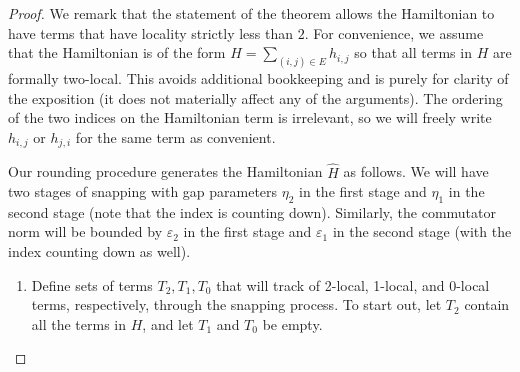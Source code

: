 \documentclass[a4paper,onecolumn,11pt]{quantumarticle}
\theoremstyle{plain}
\newcommand{\eps}{\varepsilon}
\begin{document}
\begin{proof}
We remark that the statement of the theorem allows the Hamiltonian to have terms that have locality strictly less than $2$. For convenience, we assume that the Hamiltonian is of the form $H = \sum_{(i,j) \in E} h_{i,j}$ so that all terms in $H$ are formally two-local. This avoids additional bookkeeping and is purely for clarity of the exposition (it does not materially affect any of the arguments). The ordering of the two indices on the Hamiltonian term is irrelevant, so we will freely write $h_{i,j}$ or $h_{j,i}$ for the same term as convenient.

Our rounding procedure generates the Hamiltonian $\hat{H}$ as follows. We will have two stages of snapping with gap parameters $\eta_2$ in the first stage and $\eta_1$ in the second stage (note that the index is counting down). Similarly, the commutator norm will be bounded by $\eps_2$ in the first stage and $\eps_1$ in the second stage (with the index counting down as well).

\begin{enumerate}

    \item Define sets of terms $T_2, T_1, T_0$ that will track of 2-local, 1-local, and 0-local terms, respectively, through the snapping process. To start out, let $T_2$ contain all the terms in $H$, and let $T_1$ and $T_0$ be empty.
    

\end{enumerate}
\end{proof}
\end{document}
